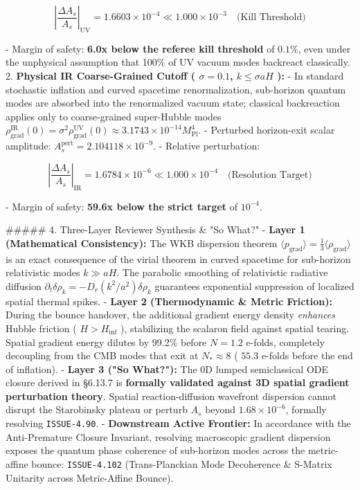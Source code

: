\documentclass[11pt,a4paper]{article}
\theoremstyle{definition}
\theoremstyle{remark}
\begin{document}
\begin{equation}
\left|\frac{\Delta A_s}{A_s}\right|_{\text{UV}} = 1.6603 \times 10^{-4} \ll 1.000 \times 10^{-3} \quad \text{(Kill Threshold)}
\end{equation}


- Margin of safety: \textbf{6.0x below the referee kill threshold} of $0.1\%$, even under the unphysical assumption that 100\% of UV vacuum modes backreact classically.
2. \textbf{Physical IR Coarse-Grained Cutoff ( $\sigma = 0.1$, $k \le \sigma a H$ ):}
- In standard stochastic inflation and curved spacetime renormalization, sub-horizon quantum modes are absorbed into the renormalized vacuum state; classical backreaction applies only to coarse-grained super-Hubble modes $\rho_{\text{grad}}^{\text{IR}}(0) = \sigma^2 \rho_{\text{grad}}^{\text{UV}}(0) \approx 3.1743 \times 10^{-14} M_{\text{Pl}}^4$.
- Perturbed horizon-exit scalar amplitude: $A_s^{\text{pert}} = 2.104118 \times 10^{-9}$.
- Relative perturbation:


\begin{equation}
\left|\frac{\Delta A_s}{A_s}\right|_{\text{IR}} = 1.6784 \times 10^{-6} \ll 1.000 \times 10^{-4} \quad \text{(Resolution Target)}
\end{equation}


- Margin of safety: \textbf{59.6x below the strict target} of $10^{-4}$.

\#\#\#\#\# 4. Three-Layer Reviewer Synthesis \& "So What?"
- \textbf{Layer 1 (Mathematical Consistency):} The WKB dispersion theorem $\langle p_{\text{grad}} \rangle = \frac{1}{3} \langle \rho_{\text{grad}} \rangle$ is an exact consequence of the virial theorem in curved spacetime for sub-horizon relativistic modes $k \gg aH$. The parabolic smoothing of relativistic radiative diffusion $\partial_t \delta\rho_k = - D_r (k^2/a^2) \delta\rho_k$ guarantees exponential suppression of localized spatial thermal spikes.
- \textbf{Layer 2 (Thermodynamic \& Metric Friction):} During the bounce handover, the additional gradient energy density \textit{enhances} Hubble friction ( $H > H_{\text{inf}}$ ), stabilizing the scalaron field against spatial tearing. Spatial gradient energy dilutes by 99.2\% before $N = 1.2$ e-folds, completely decoupling from the CMB modes that exit at $N_* \approx 8$ ( $55.3$ e-folds before the end of inflation).
- \textbf{Layer 3 ("So What?"):} The 0D lumped semiclassical ODE closure derived in \S 6.13.7 is \textbf{formally validated against 3D spatial gradient perturbation theory}. Spatial reaction-diffusion wavefront dispersion cannot disrupt the Starobinsky plateau or perturb $A_s$ beyond $1.68 \times 10^{-6}$, formally resolving \texttt{ISSUE-4.90}.
- \textbf{Downstream Active Frontier:} In accordance with the Anti-Premature Closure Invariant, resolving macroscopic gradient dispersion exposes the quantum phase coherence of sub-horizon modes across the metric-affine bounce: \texttt{ISSUE-4.102} (Trans-Planckian Mode Decoherence \& S-Matrix Unitarity across Metric-Affine Bounce).
\end{document}
